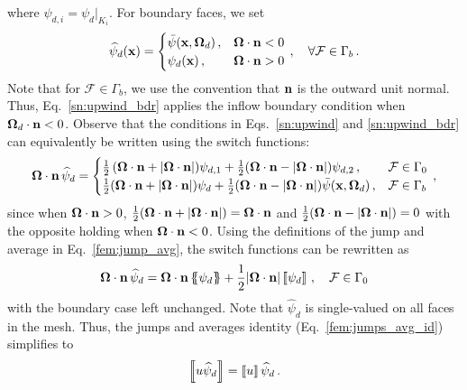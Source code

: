 \documentclass[../doc.tex]{subfiles}
\begin{document}
where $\psi_{d,i} = \psi_d|_{K_i}$. For boundary faces, we set 
	\begin{equation} \label{sn:upwind_bdr}
		\widehat{\psi}_d(\boldsymbol{\mathrm{x}}) = \begin{cases}
			\bar{\psi}(\boldsymbol{\mathrm{x}},\boldsymbol{\Omega}_d) \,, & \boldsymbol{\Omega}\cdot\boldsymbol{\mathrm{n}} < 0 \\
			\psi_d(\boldsymbol{\mathrm{x}}) \,, & \boldsymbol{\Omega}\cdot\boldsymbol{\mathrm{n}} > 0 
		\end{cases} \,, \quad \forall \mathcal{F} \in \Gamma_b \,. 
	\end{equation}
Note that for $\mathcal{F} \in \Gamma_b$, we use the convention that $\boldsymbol{\mathrm{n}}$ is the outward unit normal. Thus, Eq.~\ref{sn:upwind_bdr} applies the inflow boundary condition when $\boldsymbol{\Omega}_d\cdot\boldsymbol{\mathrm{n}}<0$. Observe that the conditions in Eqs.~\ref{sn:upwind} and \ref{sn:upwind_bdr} can equivalently be written using the switch functions: 
	\begin{equation}
		\boldsymbol{\Omega}\cdot\boldsymbol{\mathrm{n}}\,\widehat{\psi}_d = \begin{cases}
			\frac{1}{2}\left( \boldsymbol{\Omega}\cdot\boldsymbol{\mathrm{n}} + |\boldsymbol{\Omega}\cdot\boldsymbol{\mathrm{n}}| \right)\!\psi_{d,1} + \frac{1}{2}(\boldsymbol{\Omega}\cdot\boldsymbol{\mathrm{n}} - |\boldsymbol{\Omega}\cdot\boldsymbol{\mathrm{n}}|)\psi_{d,2} \,, & \mathcal{F} \in \Gamma_0 \\ 
			\frac{1}{2}(\boldsymbol{\Omega}\cdot\boldsymbol{\mathrm{n}} + |\boldsymbol{\Omega}\cdot\boldsymbol{\mathrm{n}}|)\psi_{d} + \frac{1}{2}(\boldsymbol{\Omega}\cdot\boldsymbol{\mathrm{n}} - |\boldsymbol{\Omega}\cdot\boldsymbol{\mathrm{n}}|)\bar{\psi}(\boldsymbol{\mathrm{x}},\boldsymbol{\Omega}_d) \,, & \mathcal{F} \in \Gamma_b 
		\end{cases} \,, 
	\end{equation}
since when $\boldsymbol{\Omega}\cdot\boldsymbol{\mathrm{n}}>0$, $\frac{1}{2}(\boldsymbol{\Omega}\cdot\boldsymbol{\mathrm{n}} + |\boldsymbol{\Omega}\cdot\boldsymbol{\mathrm{n}}|) = \boldsymbol{\Omega}\cdot\boldsymbol{\mathrm{n}}$ and $\frac{1}{2}(\boldsymbol{\Omega}\cdot\boldsymbol{\mathrm{n}} - |\boldsymbol{\Omega}\cdot\boldsymbol{\mathrm{n}}|) = 0$ with the opposite holding when $\boldsymbol{\Omega}\cdot\boldsymbol{\mathrm{n}}<0$. Using the definitions of the jump and average in Eq.~\ref{fem:jump_avg}, the switch functions can be rewritten as 
	\begin{equation}
		\boldsymbol{\Omega}\cdot\boldsymbol{\mathrm{n}}\,\widehat{\psi}_d = 
			\boldsymbol{\Omega}\cdot\boldsymbol{\mathrm{n}}\left\{\!\!\left\{\psi_d\right\}\!\!\right\} + \frac{1}{2}|\boldsymbol{\Omega}\cdot\boldsymbol{\mathrm{n}}|\left\llbracket\psi_d \right\rrbracket \,, \quad \mathcal{F} \in \Gamma_0 
	\end{equation}
with the boundary case left unchanged. Note that $\widehat{\psi}_d$ is single-valued on all faces in the mesh. Thus, the jumps and averages identity (Eq.~\ref{fem:jumps_avg_id}) simplifies to 
	\begin{equation}
		\left\llbracket u\widehat{\psi}_d \right\rrbracket = \left\llbracket u \right\rrbracket \widehat{\psi}_d \,. 
	\end{equation}
\end{document}
